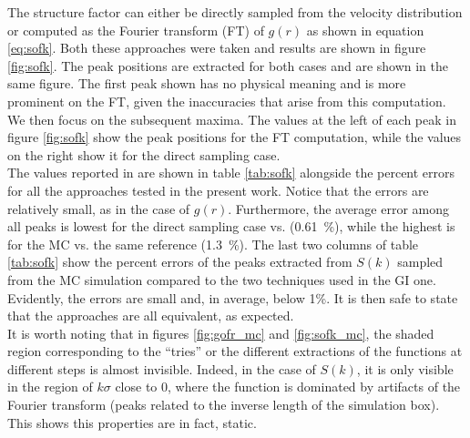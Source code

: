 \documentclass[%
aps,
pra,%
amsmath,amssymb,
preprint,%
reprint,%
notitlepage,
a4paper]{revtex4-1}
\begin{document}
The structure factor can either be directly sampled from the velocity distribution or computed as the Fourier transform (FT) of $g(r)$ as shown in equation \ref{eq:sofk}. Both these approaches were taken and results are shown in figure \ref{fig:sofk}. The peak positions are extracted for both cases and are shown in the same figure. The first peak shown has no physical meaning and is more prominent on the FT, given the inaccuracies that arise from this computation. We then focus on the subsequent maxima. The values at the left of each peak in figure \ref{fig:sofk} show the peak positions for the FT computation, while the values on the right show it for the direct sampling case.\\
The values reported in \citet{Rahman1964} are shown in table \ref{tab:sofk} alongside the percent errors for all the approaches tested in the present work. Notice that the errors are relatively small, as in the case of $g(r)$. Furthermore, the average error among all peaks is lowest for the direct sampling case vs. \citet{Rahman1964} (0.61~\%), while the highest is for the MC vs. the same reference (1.3~\%). The last two columns of table \ref{tab:sofk} show the percent errors of the peaks extracted from $S(k)$ sampled from the MC simulation compared to the two techniques used in the GI one. Evidently, the errors are small and, in average, below 1\%. It is then safe to state that the approaches are all equivalent, as expected.\\
It is worth noting that in figures \ref{fig:gofr_mc} and \ref{fig:sofk_mc}, the shaded region corresponding to the ``tries'' or the different extractions of the functions at different steps is almost invisible. Indeed, in the case of $S(k)$, it is only visible in the region of $k\sigma$ close to 0, where the function is dominated by artifacts of the Fourier transform (peaks related to the inverse length of the simulation box). This shows this properties are in fact, static.
\end{document}
